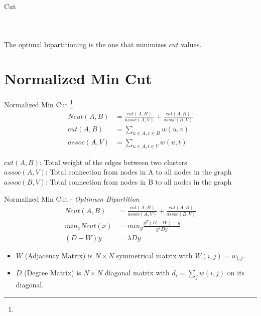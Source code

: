 \documentclass[10pt,xcolor=svgnames]{beamer} %
\begin{document}
\begin{frame}{Cut}
\begin{columns}
\begin{figure}
{
            }
    \end{figure}
    
    \end{columns}
    The optimal bipartitioning is the one that minimizes $cut$ values.
\end{frame}

\section{Normalized Min Cut}
\begin{frame}{Normalized Min Cut \footnote{}}
    \begin{align}
        Ncut(A,B) & = \frac{cut(A,B)}{assoc(A,V)} + \frac{cut(A,B)}{assoc(B,V)} \\
        cut(A,B) &= \sum_{u \in A, v \in B} w(u,v)\\
        assoc(A,V) &= \sum_{u \in A, t\in V} w(u,t)
    \end{align}
    
$cut(A,B)$: Total weight of the edges between two clusters \\
$assoc(A,V)$: Total connection from nodes in A to all nodes in the graph \\
$assoc(B,V)$: Total connection from nodes in B to all nodes in the graph \\

\end{frame}

\begin{frame}{Normalized Min Cut - \textit{Optimum Bipartition}}
    \begin{align}
        Ncut(A,B) & = \frac{cut(A,B)}{assoc(A,V)} + \frac{cut(A,B)}{assoc(B,V)} \\
        min_xNcut(x) &= min_y\frac{y^T(D-W)-y}{y^T D y} \\
        (D-W)y &= \lambda D y
    \end{align}
    
\begin{itemize}
    \item $W$ (Adjacency Matrix) is $N \times N$ symmetrical matrix with $W(i,j) = w_{i,j} $.
    \item $D$ (Degree Matrix) is $N \times N$ diagonal matrix with $d_i = \sum_j w(i,j) $ on its diagonal. \\
\end{itemize}

\end{frame}
\end{document}
